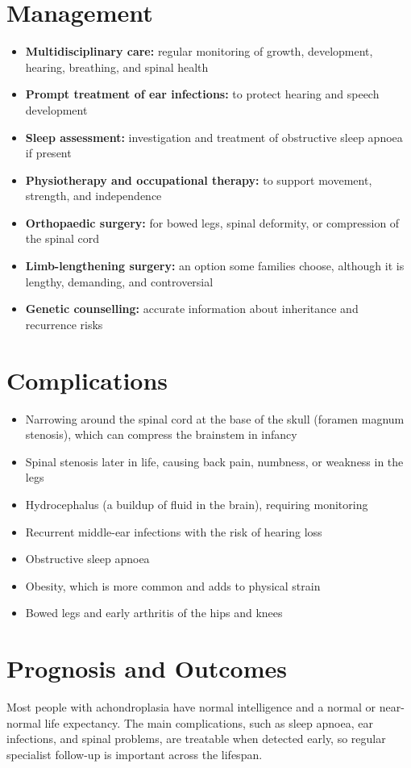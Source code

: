 \section*{Management}
\begin{itemize}
    \item \textbf{Multidisciplinary care:} regular monitoring of growth, development, hearing, breathing, and spinal health
    \item \textbf{Prompt treatment of ear infections:} to protect hearing and speech development
    \item \textbf{Sleep assessment:} investigation and treatment of obstructive sleep apnoea if present
    \item \textbf{Physiotherapy and occupational therapy:} to support movement, strength, and independence
    \item \textbf{Orthopaedic surgery:} for bowed legs, spinal deformity, or compression of the spinal cord
    \item \textbf{Limb-lengthening surgery:} an option some families choose, although it is lengthy, demanding, and controversial
    \item \textbf{Genetic counselling:} accurate information about inheritance and recurrence risks
\end{itemize}

\section*{Complications}
\begin{itemize}
    \item Narrowing around the spinal cord at the base of the skull (foramen magnum stenosis), which can compress the brainstem in infancy
    \item Spinal stenosis later in life, causing back pain, numbness, or weakness in the legs
    \item Hydrocephalus (a buildup of fluid in the brain), requiring monitoring
    \item Recurrent middle-ear infections with the risk of hearing loss
    \item Obstructive sleep apnoea
    \item Obesity, which is more common and adds to physical strain
    \item Bowed legs and early arthritis of the hips and knees
\end{itemize}

\section*{Prognosis and Outcomes}
Most people with achondroplasia have normal intelligence and a normal or near-normal life expectancy. The main complications, such as sleep apnoea, ear infections, and spinal problems, are treatable when detected early, so regular specialist follow-up is important across the lifespan.

